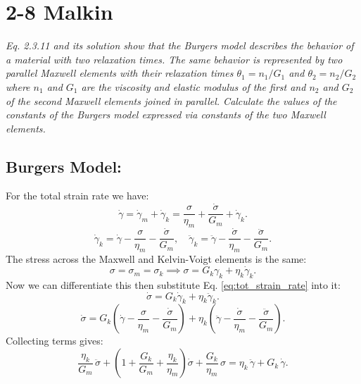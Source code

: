 \documentclass[12pt, a4paper]{article}
\numberwithin{equation}{section}
\begin{document}
\section{2-8 Malkin}
\textit{Eq. 2.3.11 and its solution show that the \emph{Burgers model} describes the behavior of a material with two relaxation times. The same behavior is represented by two parallel Maxwell elements with their relaxation times $\theta_1 = n_1/G_1$ and $\theta_2 = n_2/G_2$ where $n_1$ and $G_1$ are the viscosity and elastic modulus of the first and $n_2$ and $G_2$ of the second Maxwell elements  joined in parallel. Calculate the values of the constants of the Burgers model expressed via constants of the two Maxwell elements.}

\subsection{Burgers Model:}
For the total strain rate we have:
\begin{equation*}
	\dot\gamma = \dot\gamma_m + \dot\gamma_k
	= \frac{\sigma}{\eta_m} + \frac{\dot\sigma}{G_m} + \dot\gamma_k.
\end{equation*}
\begin{equation*}
	\dot\gamma_k = \dot\gamma - \frac{\sigma}{\eta_m} - \frac{\dot\sigma}{G_m}, \quad
	\ddot\gamma_k = \ddot\gamma - \frac{\dot\sigma}{\eta_m} - \frac{\ddot\sigma}{G_m}.
	\label{eq:tot_strain_rate}
\end{equation*}
The stress across the Maxwell and Kelvin-Voigt elements is the same:
\begin{equation*}
	\sigma = \sigma_m = \sigma_k
	\implies
	\sigma = G_k\gamma_k + \eta_k \dot\gamma_k.
\end{equation*}
Now we can differentiate this then substitute Eq. \ref{eq:tot_strain_rate} into it:
\begin{equation*}
	\dot\sigma = G_k \dot\gamma_k + \eta_k \ddot\gamma_k.
\end{equation*}
\begin{equation*}
	\dot\sigma
	= G_k \left(\dot\gamma - \frac{\sigma}{\eta_m} - \frac{\dot\sigma}{G_m}\right)
	+ \eta_k \left(\ddot\gamma - \frac{\dot\sigma}{\eta_m} - \frac{\ddot\sigma}{G_m}\right).
\end{equation*}
Collecting terms gives:
\begin{equation}
	\frac{\eta_k}{G_m}\,\ddot\sigma
	+ \left(1 + \frac{G_k}{G_m} + \frac{\eta_k}{\eta_m}\right)\dot\sigma
	+ \frac{G_k}{\eta_m}\,\sigma
	= \eta_k\,\ddot\gamma + G_k\,\dot\gamma.
	\label{eq:burgers_model}
\end{equation}
\end{document}

